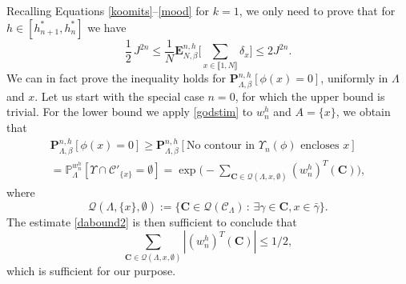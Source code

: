\documentclass[JEP,XML,SOM,Unicode, NoFloatCountersInSection]{cedram}
\let\mathcal\mathscr
\newcommand{\sep}{\,:\,}
\numberwithin{equation}{section}
\theoremstyle{plain}
\theoremstyle{definition}
\newcommand{\lint}{\llbracket}
\newcommand{\rint}{\rrbracket}
\newcommand{\cQ}{{\ensuremath{\mathcal Q}} }
\newcommand{\cC}{{\ensuremath{\mathcal C}} }
\newcommand{\bP}{{\ensuremath{\mathbf P}} }
\newcommand{\bE}{{\ensuremath{\mathbf E}} }
\newcommand{\bC}{{\ensuremath{\mathbf C}} }
\newcommand{\bbP}{{\ensuremath{\mathbb P}} }
\newcommand{\gb}{\beta}
\newcommand{\gL}{\Lambda}
\begin{document}
Recalling Equations \eqref{koomits}--\eqref{mood} for $k=1$, we only need to prove that
for $h\in [h^*_{n+1},h^*_n]$ we have
\begin{equation*}
\frac{1}{2}\, J^{2n}\le \frac{1}{N}\bE^{n,h}_{N,\gb}\biggl[ \sum_{x\in \lint 1, N\rint}\delta_x\biggr]\le 2J^{2n}.
\end{equation*}
We can in fact prove the inequality holds for $\bP^{n,h}_{\gL,\gb}\left[ \phi(x)=0 \right]$, uniformly in $\gL$ and $x$.
Let us start with the special case $n=0$, for which the upper bound is trivial.
For the lower bound we apply \eqref{godstim} to $w^h_n$ and $A=\{x\}$,
we obtain that
\begin{multline*}
\bP^{n,h}_{\gL,\gb}[\phi(x)=0]\ge \bP^{n,h}_{\gL,\gb}[ \text{No contour in } \Upsilon_n(\phi) \text{ encloses } x]\\
=\bbP^{w^h_n}_{\gL}\left[ \Upsilon \cap \cC'_{\{x\}}=\emptyset \right]
=\exp\biggl(-\sum_{\bC\in \cQ(\gL,x,\emptyset)} (w^h_n)^T(\bC)\biggr),
\end{multline*}
where
\begin{equation*}
\cQ(\gL,\{x\},\emptyset):=\{ \bC \in \cQ(\cC_{\gL}) \sep \exists \gamma \in \bC, x\in \bar \gamma\}.
\end{equation*}
The estimate \eqref{dabound2} is then sufficient to conclude that
\begin{equation*}
\sum_{\bC\in \cQ(\gL,x,\emptyset)} |(w^h_n)^T(\bC)|\le 1/2,
\end{equation*}
which is sufficient for our purpose.
\end{document}
